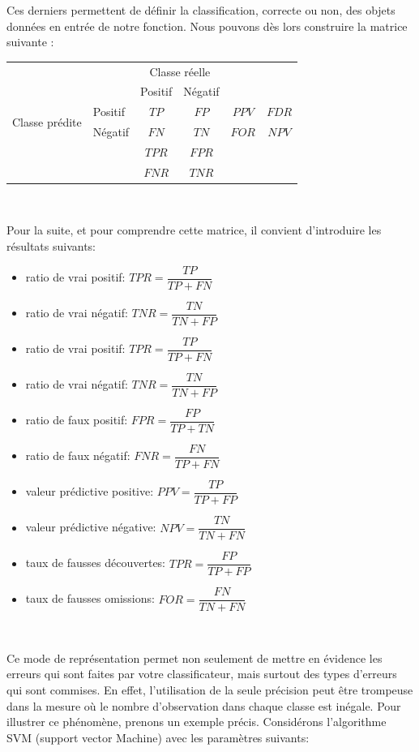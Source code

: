 \documentclass[a4paper]{report}
\begin{document}
Ces derniers permettent de définir la classification, correcte ou non, des objets données en entrée de notre fonction. Nous pouvons dès lors construire la matrice suivante : 

\begin{tabular}{ l | l | c | c | c c}
\multicolumn{2}{c}{} & \multicolumn{2}{c}{Classe réelle} & \\
\cline{3-4}
\multicolumn{2}{c|}{} & Positif & Négatif \\
\cline{2-4}
\multirow{2}{*}{Classe prédite} & Positif & $TP$ & $FP$ & $PPV$ & $FDR$ \\
\cline{2-4}
& Négatif & $FN$ & $TN$ & $FOR$ & $NPV$ \\
\cline{2-4}
\multicolumn{1}{r}{} & \multicolumn{1}{l}{} & \multicolumn{1}{c}{$TPR$} & \multicolumn{1}{c}{$FPR$} \\
\multicolumn{1}{l}{} & \multicolumn{1}{l}{} & \multicolumn{1}{c}{$FNR$} & \multicolumn{1}{c}{$TNR$} \\
\end{tabular}

~\par

Pour la suite, et pour comprendre cette matrice, il convient d'introduire les résultats suivants:

\begin{itemize}\setlength{\itemsep}{1.5mm}
\item ratio de vrai positif: $TPR=\dfrac{TP}{TP+FN}$
\item ratio de vrai négatif: $TNR=\dfrac{TN}{TN+FP}$
\item ratio de vrai positif: $TPR=\dfrac{TP}{TP+FN}$
\item ratio de vrai négatif: $TNR=\dfrac{TN}{TN+FP}$
\item ratio de faux positif: $FPR=\dfrac{FP}{TP+TN}$
\item ratio de faux négatif: $FNR=\dfrac{FN}{TP+FN}$
\item valeur prédictive positive: $PPV=\dfrac{TP}{TP+FP}$
\item valeur prédictive négative: $NPV=\dfrac{TN}{TN+FN}$
\item taux de fausses découvertes: $TPR=\dfrac{FP}{TP+FP}$
\item taux de fausses omissions: $FOR=\dfrac{FN}{TN+FN}$
\end{itemize}

~\par

Ce mode de représentation permet non seulement de mettre en évidence les erreurs qui sont faites par votre classificateur, mais surtout des types d'erreurs qui sont commises. En effet, l'utilisation de la seule précision peut être trompeuse dans la mesure où le nombre d'observation dans chaque classe est inégale. 
Pour illustrer ce phénomène, prenons un exemple précis. Considérons l'algorithme SVM (support vector Machine) avec les paramètres suivants:
\medbreak
\end{document}
